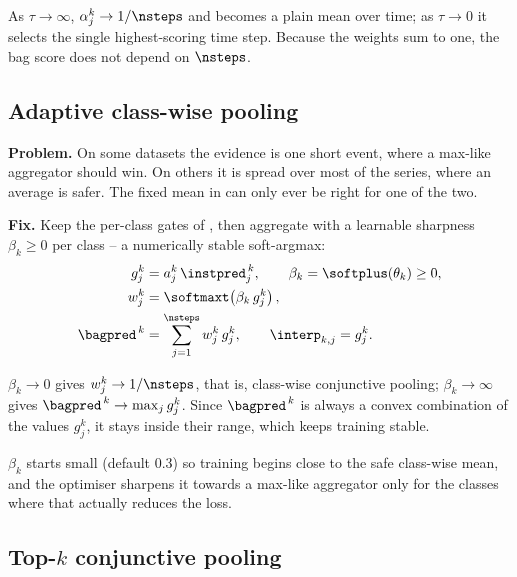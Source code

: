 \begin{property}
\label{prop:sm}
As $\tau \to \infty$, $\alpha_j^k \to 1/\nsteps$ and  becomes a plain mean over
time; as $\tau \to 0$ it selects the single highest-scoring time step. Because the weights sum to
one, the bag score does not depend on $\nsteps$.
\end{property}

\subsection{Adaptive class-wise pooling}
\label{sec:pool:adaptive}

\textbf{Problem.} On some datasets the evidence is one short event, where a max-like aggregator
should win. On others it is spread over most of the series, where an average is safer. The fixed
mean in  can only ever be right for one of the two.

\textbf{Fix.} Keep the per-class gates of , then aggregate with a learnable
sharpness $\beta_k \geq 0$ per class -- a numerically stable soft-argmax:
\begin{align}
  g_j^k &= a_j^k \, \instpred_j^{\,k},
  \qquad \beta_k = \softplus(\theta_k) \geq 0,
  \label{eq:ad_beta}\\
  w_j^k &= \softmaxt\!\left(\beta_k \, g_j^k\right),
  \label{eq:ad_weights}\\
  \bagpred^{\,k} &= \sum_{j=1}^{\nsteps} w_j^k \, g_j^k,
  \qquad
  \interp_{k,j} = g_j^k .
  \label{eq:ad_bag}
\end{align}

\begin{property}
\label{prop:ad}
$\beta_k \to 0$ gives $w_j^k \to 1/\nsteps$, that is, class-wise conjunctive pooling;
$\beta_k \to \infty$ gives $\bagpred^{\,k} \to \max_j g_j^k$. Since $\bagpred^{\,k}$ is always a
convex combination of the values $g_j^k$, it stays inside their range, which keeps training stable.
\end{property}

$\beta_k$ starts small (default $0.3$) so training begins close to the safe
class-wise mean, and the optimiser sharpens it towards a max-like aggregator only for the classes
where that actually reduces the loss.

\subsection{Top-$k$ conjunctive pooling}
\label{sec:pool:topk}

